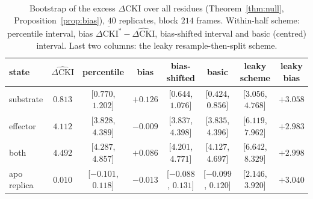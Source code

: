 \documentclass[11pt,reqno]{amsart}
\theoremstyle{plain}
\theoremstyle{definition}
\theoremstyle{remark}
\numberwithin{equation}{section}
\begin{document}
\begin{table}[ht]
\centering\footnotesize\setlength{\tabcolsep}{3.2pt}
\caption{Bootstrap of the excess $\Delta\mathrm{CKI}$ over all residues (Theorem~\ref{thm:null}, Proposition~\ref{prop:bias}), $40$ replicates, block $214$ frames. Within-half scheme: percentile interval, bias $\overline{\Delta\mathrm{CKI}^*}-\widehat{\Delta\mathrm{CKI}}$, bias-shifted interval and basic (centred) interval. Last two columns: the leaky resample-then-split scheme.}
\label{tab:bootstrap}
\begin{tabular}{@{}l c c c c c c c@{}}
\toprule
state & $\widehat{\Delta\mathrm{CKI}}$ & percentile & bias & bias-shifted & basic & leaky scheme & leaky bias \\
\midrule
substrate & $0.813$ & [$0.770$, $1.202$] & $+0.126$ & [$0.644$, $1.076$] & [$0.424$, $0.856$] & [$3.056$, $4.768$] & $+3.058$ \\
effector & $4.112$ & [$3.828$, $4.389$] & $-0.009$ & [$3.837$, $4.398$] & [$3.835$, $4.396$] & [$6.119$, $7.962$] & $+2.983$ \\
both & $4.492$ & [$4.287$, $4.857$] & $+0.086$ & [$4.201$, $4.771$] & [$4.127$, $4.697$] & [$6.642$, $8.329$] & $+2.998$ \\
apo replica & $0.010$ & [$-0.101$, $0.118$] & $-0.013$ & [$-0.088$, $0.131$] & [$-0.099$, $0.120$] & [$2.146$, $3.920$] & $+3.040$ \\
\bottomrule
\end{tabular}
\end{table}
\end{document}
